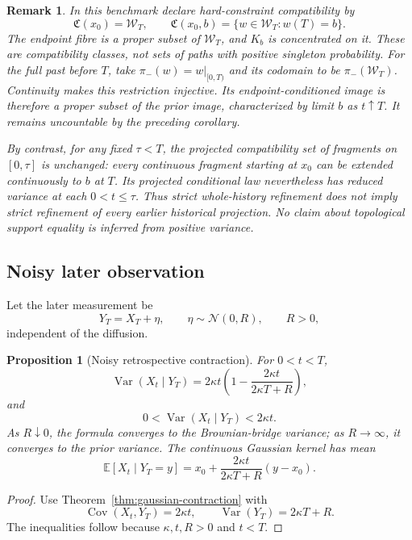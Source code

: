 \documentclass[11pt]{article}
\newtheorem{proposition}[definition]{Proposition}
\newtheorem{remark}[definition]{Remark}
\newcommand{\Wcal}{\mathcal W}
\newcommand{\Ccal}{\mathfrak C}
\begin{document}
\begin{remark}
\label{rem:bridge-compatibility}
In this benchmark declare hard-constraint compatibility by
\[
\Ccal(x_0)=\Wcal_T,\qquad
\Ccal(x_0,b)=\{w\in\Wcal_T:w(T)=b\}.
\]
The endpoint fibre is a proper subset of $\Wcal_T$, and $K_b$ is
concentrated on it. These are compatibility classes, not sets of paths
with positive singleton probability.
For the full past before $T$, take $\pi_-(w)=w|_{[0,T)}$ and its
codomain to be $\pi_-(\Wcal_T)$. Continuity makes this restriction
injective. Its endpoint-conditioned image is therefore a proper
subset of the prior image, characterized by limit $b$ as $t\uparrow T$.
It remains uncountable by the preceding corollary.

By contrast, for any fixed $\tau<T$, the projected compatibility set
of fragments on $[0,\tau]$ is unchanged: every continuous fragment
starting at $x_0$ can be extended continuously to $b$ at $T$.
Its projected conditional law nevertheless has reduced variance at
each $0<t\le\tau$. Thus strict whole-history refinement does not imply
strict refinement of every earlier historical projection. No claim
about topological support equality is inferred from positive variance.
\end{remark}

\subsection{Noisy later observation}

Let the later measurement be
\[
Y_T=X_T+\eta,
\qquad
\eta\sim\mathcal N(0,R),
\qquad
R>0,
\]
independent of the diffusion.

\begin{proposition}[Noisy retrospective contraction]
\label{prop:noisy-contraction}
For \(0<t<T\),
\[
\operatorname{Var}(X_t\mid Y_T)
=
2\kappa t\left(1-\frac{2\kappa t}{2\kappa T+R}\right),
\]
and
\[
0<
\operatorname{Var}(X_t\mid Y_T)
<
2\kappa t.
\]
As \(R\downarrow0\), the formula converges to the Brownian-bridge
variance; as $R\to\infty$, it converges to the prior variance.
The continuous Gaussian kernel has mean
\[
\mathbb E[X_t\mid Y_T=y]
=x_0+\frac{2\kappa t}{2\kappa T+R}(y-x_0).
\]
\end{proposition}

\begin{proof}
Use Theorem~\ref{thm:gaussian-contraction} with
\[
\operatorname{Cov}(X_t,Y_T)=2\kappa t,
\qquad
\operatorname{Var}(Y_T)=2\kappa T+R.
\]
The inequalities follow because \(\kappa,t,R>0\) and \(t<T\).
\end{proof}
\end{document}
